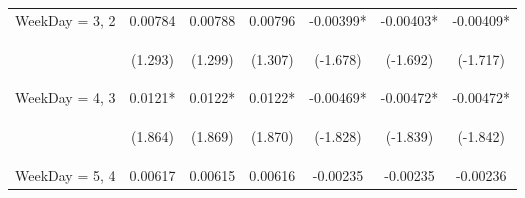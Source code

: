 \documentclass[]{standalone}
\begin{document}
\begin{tabular}{lcccccc}
    WeekDay = 3, 2   & 0.00784                                        & 0.00788                                        & 0.00796                                        & -0.00399*                                      & -0.00403*                                      & -0.00409*                                      \\
    \vspace{4pt}     & \begin{footnotesize}(1.293)\end{footnotesize}  & \begin{footnotesize}(1.299)\end{footnotesize}  & \begin{footnotesize}(1.307)\end{footnotesize}  & \begin{footnotesize}(-1.678)\end{footnotesize} & \begin{footnotesize}(-1.692)\end{footnotesize} & \begin{footnotesize}(-1.717)\end{footnotesize} \\
    WeekDay = 4, 3   & 0.0121*                                        & 0.0122*                                        & 0.0122*                                        & -0.00469*                                      & -0.00472*                                      & -0.00472*                                      \\
    \vspace{4pt}     & \begin{footnotesize}(1.864)\end{footnotesize}  & \begin{footnotesize}(1.869)\end{footnotesize}  & \begin{footnotesize}(1.870)\end{footnotesize}  & \begin{footnotesize}(-1.828)\end{footnotesize} & \begin{footnotesize}(-1.839)\end{footnotesize} & \begin{footnotesize}(-1.842)\end{footnotesize} \\
    WeekDay = 5, 4   & 0.00617                                        & 0.00615                                        & 0.00616                                        & -0.00235                                       & -0.00235                                       & -0.00236                                       \\

\end{tabular}
\end{document}
